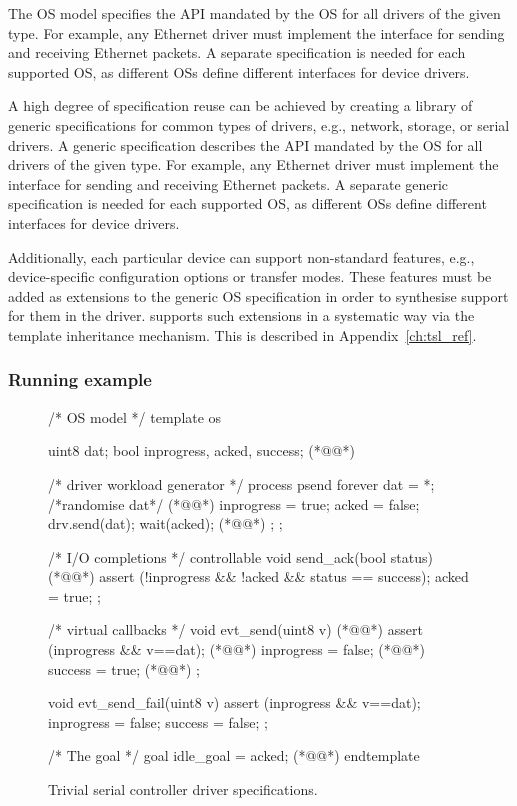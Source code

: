 The OS model specifies the API mandated by the OS for all drivers of the given type.  For example, any Ethernet driver must implement the interface for sending and receiving Ethernet packets.  A separate specification is needed for each supported OS, as different OSs define different interfaces for device drivers.

A high degree of specification reuse can be achieved by  creating a library of generic specifications for common types of drivers, e.g., network, storage, or serial drivers.  A generic specification describes the API mandated by the OS for all drivers of the given type.  For example, any Ethernet driver must implement the interface for sending and receiving Ethernet packets.  A separate generic specification is needed for each supported OS, as different OSs define different interfaces for device drivers.

Additionally, each particular device can support non-standard features, e.g., device-specific configuration options or transfer modes.  These features must be added as extensions to the generic OS specification in order to synthesise support for them in the driver.  \tsl supports such extensions in a systematic way via the template inheritance mechanism.  This is described in Appendix~\ref{ch:tsl_ref}.

\subsubsection{Running example}

\begin{figure}
\lstset{firstnumber=last}
\begin{tsllisting}[name=ex]
/* OS model */
template os 

    uint8 dat;
    bool inprogress, acked, success; (*@\label{f:ex_os:l:vars}@*)

    /* driver workload generator */
    process psend {
        forever {
            dat = *; /*randomise dat*/ (*@\label{f:ex_os:l:nondet}@*)
            inprogress = true;
            acked = false;
            drv.send(dat);
            wait(acked); (*@\label{f:ex_os:l:wait}@*)
        };
    };

    /* I/O completions */
    controllable void send_ack(bool status) { (*@\label{f:ex_os:l:ack}@*)
        assert (!inprogress && !acked && status == success);
        acked = true;
    };

    /* virtual callbacks */
    void evt_send(uint8 v) { (*@\label{f:ex_os:l:send_cb}@*)
        assert (inprogress && v==dat); (*@\label{f:ex_os:l:assert}@*)
        inprogress = false; (*@\label{f:ex_os:l:inprogress}@*)
        success = true; (*@\label{f:ex_os:l:success}@*)
    };

    void evt_send_fail(uint8 v) {
        assert (inprogress && v==dat);
        inprogress = false;
        success = false;
    };

    /* The goal */
    goal idle_goal = acked; (*@\label{f:ex_os:l:goal}@*)
endtemplate
\end{tsllisting}
\caption{Trivial serial controller driver specifications.}
\label{f:ex_os}
\end{figure}

